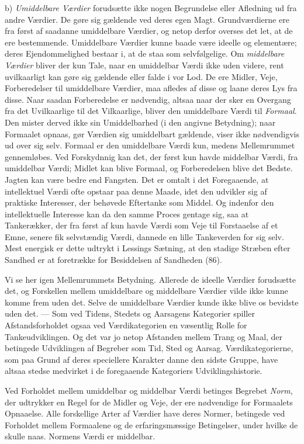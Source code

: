\documentclass[12pt,a4paper]{book}
\newcommand{\opage}[1]{\marginnote{\footnotesize\textit{[#1]}}}
\newcommand{\apage}[1]{\marginnote{\footnotesize\textit{[#1]}}}
\begin{document}
b) \emph{Umiddelbare Værdier} forudsætte ikke nogen Begrundelse eller Afledning ud
fra andre Værdier. De gøre sig gældende ved deres egen Magt. Grundværdierne ere
fra først af saadanne umiddelbare Værdier, og netop derfor overses det let, at de
ere bestemmende. Umiddelbare Værdier kunne baade være ideelle og elementære; deres
Ejendommelighed bestaar i, at de staa som selvfølgelige. Om \emph{middelbare
Værdier} bliver der kun Tale, naar en umiddelbar Værdi ikke uden videre, rent
uvilkaarligt kan gøre sig gældende eller falde i vor Lod. De ere Midler, Veje,
Forberedelser til umiddelbare Værdier, maa afledes af disse og laane deres Lys \apage{242} fra
disse. Naar saadan Forberedelse er nødvendig, altsaa naar der sker en Overgang fra
det Uvilkaarlige til det Vilkaarlige, bliver den umiddelbare Værdi til
\emph{Formaal}. Den mister derved ikke sin Umiddelbarhed (i den angivne
Betydning); naar Formaalet opnaas, gør Værdien sig umiddelbart gældende, viser ikke
nødvendigvis ud over sig selv. Formaal er den umiddelbare Værdi kun, medens
Mellemrummet gennemløbes. Ved Forskydnnig kan det, der først kun havde middelbar
Værdi, fra umiddelbar Værdi; Midlet kan blive Formaal, og Forberedelsen blive det
Bedste. Jagten kan være bedre end Fangsten. Det er omtalt i det Foregaaende, at
intellektuel Værdi ofte opstaar paa denne Maade, idet den udvikler sig af
praktiske Interesser, der behøvede Eftertanke som Middel. Og indenfor den
intellektuelle Interesse kan da den samme Proces gentage sig, saa at Tankerækker,
der fra først af kun havde Værdi som Veje til Forstaaelse af et Emne, senere fik
selvstændig Værdi, dannede en lille Tankeverden for sig selv. Mest energisk er
dette udtrykt i Lessings Sætning, at den stadige Stræben efter Sandhed er at
foretrække for Besiddelsen af Sandheden (86).

Vi se her igen Mellemrummets Betydning. Allerede de ideelle Værdier forudsætte
det, og Forskellen mellem umiddelbare og middelbare Værdier vilde ikke kunne komme
frem uden det. Selve de umiddelbare Værdier kunde ikke blive os bevidste uden det.
--- Som ved Tidens, Stedets og Aarsagens Kategorier spiller Afstandsforholdet
ogsaa ved Værdikategorien en væsentlig Rolle for Tankeudviklingen. Og det var jo
netop Afstanden mellem Trang og Maal, der betingede Udviklingen af Begreber som
Tid, Sted og Aarsag. Værdikategorierne, som paa Grund af deres speciellere
Karakter danne den sidste Gruppe, have altsaa stedse medvirket i de foregaaende
Kategoriers Udviklingshistorie.

Ved Forholdet mellem umiddelbar og middelbar Værdi betinges Begrebet \emph{Norm},
der udtrykker en Regel for de Midler og Veje, der ere nødvendige for Formaalets
Opnaaelse. Alle forskellige Arter af Værdier have deres Normer,
\opage{243}betingede ved
Forholdet mellem Formaalene og de erfaringsmæssige Betingelser, under hvilke de
skulle naas. Normens Værdi er middelbar.
\end{document}
